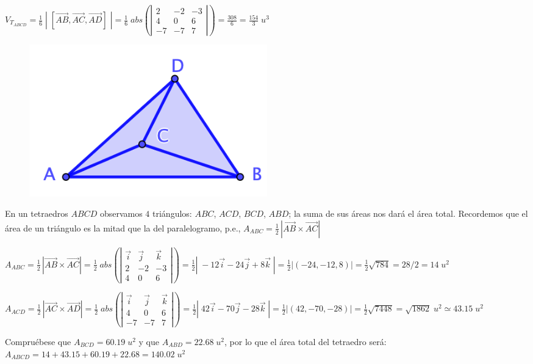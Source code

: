 \begin{proofw}\renewcommand{\qedsymbol}{$\diamond$}
	$V_{T_{ABCD}}=\frac 1 6\;  |\; [\overrightarrow{AB},\overrightarrow{AC},\overrightarrow{AD}] \;| = \frac 1 6 \; abs \left( { \left| \begin{matrix} 2&-2&-3\\4&0&6\\-7&-7&7  \end{matrix}  \right|  } \right) = \frac {308}{6}=\frac {154}{3}\; u^3$
	
	\begin{multicols}{2}
	\begin{figure}[H]
	\centering
	\includegraphics[width=0.5\textwidth]{imagenes/imagenes09/T09IM25.png}
	\end{figure}
	
	En un tetraedros $ABCD$ observamos $4$ triángulos: $ABC$, $ACD$, $BCD$, $ABD$; la suma de sus áreas nos dará el área total. Recordemos que el área de un triángulo es la mitad que la del paralelogramo, p.e., $A_{ABC}=\frac 1 2 \,| \overrightarrow{AB} \times \overrightarrow{AC}|$
	\end{multicols}

\noindent 	$A_{ABC}=\frac 1 2 \,| \overrightarrow{AB} \times \overrightarrow{AC}| = \frac 1 2 \; abs \left( \left| \begin{matrix}  \vec i & \vec j & \vec k \\2&-2&-3\\4&0&6   \end{matrix} \right|  \right)=\frac 1 2 |\;-12 \vec i -24 \vec j + 8 \vec k \; |=\frac 1 2 |(-24,-12,8)|=\frac 1 2 \sqrt{784}=28/2=14 \; u^2$

\noindent 	$A_{ACD}=\frac 1 2 \,| \overrightarrow{AC} \times \overrightarrow{AD}| = \frac 1 2 \; abs \left( \left| \begin{matrix}  \vec i & \vec j & \vec k \\4&0&6\\-7&-7&7   \end{matrix} \right|  \right)=\frac 1 2 |\; 42 \vec i - 70 \vec j - 28 \vec k \; |=\frac 1 2 |(42,-70,-28)|=\frac 1 2 \sqrt{7448}=\sqrt{1862} \; u^2 \simeq 43.15\; u^2$


Compruébese que $A_{BCD}=60.19\; u^2$ y que $A_{ABD}=22.68\; u^2$, por lo que el área total del tetraedro será: $A_{ABCD}=14+43.15+60.19+22.68=140.02\; u^2$

\end{proofw}

